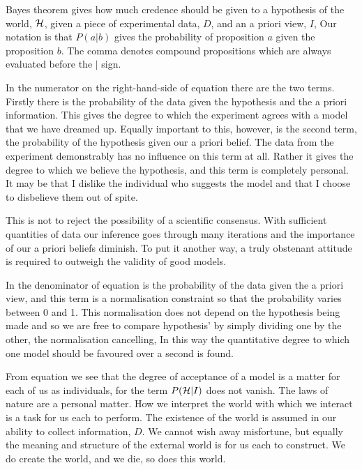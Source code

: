 Bayes theorem gives how much credence should be given to a hypothesis of
the world, ${\cal H}$,
given a piece of experimental data, $D$, and an a priori view, $I$,
Our notation is that $P(a|b)$ gives the probability of proposition $a$
given the proposition
$b$.
The comma denotes compound propositions which are always evaluated
before the $|$ sign.


In the numerator on the right-hand-side of equation  there are the
two terms.
Firstly there is the  probability of the data given the hypothesis and the a
priori information.
This gives the degree to which the experiment agrees with a model that
we have dreamed up.
Equally important to this, however,
is the second term, 
the probability of the hypothesis given our a priori belief.
The data from the experiment demonstrably has no influence
on this term at all.
Rather it gives the degree to which we believe the hypothesis,
and this term is completely personal.
It may be that I dislike the individual who suggests the model and that I
choose to disbelieve them out of spite.

This is not to reject the possibility of a scientific consensus.
With sufficient quantities of data our inference goes through many
iterations and the importance of our a priori beliefs diminish.
To put it another way,
a truly obstenant attitude is required to outweigh the validity of
good models.

In the denominator of equation  is  the probability of the data given the a priori view,
and this term is a normalisation constraint so that the  probability varies between
0 and 1.
This normalisation does not depend on the hypothesis being made and so
we are free to compare hypothesis' by simply dividing one by the
other, 
the normalisation cancelling,
In this way the quantitative degree to which one model should be favoured
over a second is found.

From equation  we see that the degree of acceptance
of a model is a matter for 
each of us as individuals, for 
the term $P({\cal H}|I)$ does not vanish.
The laws of nature are a personal matter.
How we interpret the  world with which we interact is a task for
us each to perform.
The existence of the world is assumed in our ability to
collect information, $D$.
We cannot wish away misfortune,
but equally the meaning and structure of the external world is for us each
to construct. 
We do create the world, 
and we  die, so does this world. %

